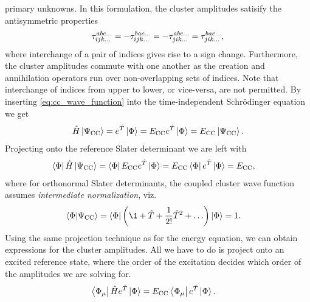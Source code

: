         primary unknowns.
        In this formulation, the cluster amplitudes satisify the antisymmetric
        properties
        \begin{align}
            \tau^{abc\dots}_{ijk\dots}
            = -\tau^{bac\dots}_{ijk\dots}
            = -\tau^{abc\dots}_{jik\dots}
            = \tau^{bac\dots}_{jik\dots},
        \end{align}
        where interchange of a pair of indices gives rise to a sign change.
        Furthermore, the cluster amplitudes commute with one another as the
        creation and annihilation operators run over non-overlapping sets of
        indices.
        Note that interchange of indices from upper to lower, or vice-versa, are
        not permitted.
        By inserting \autoref{eq:cc_wave_function} into the time-independent
        Schrödinger equation we get
        \begin{align}
            \hat{H}\ket{\Psi_{\text{CC}}}
            = e^{\hat{T}}\ket{\Phi}
            = E_{\text{CC}} e^{\hat{T}}\ket{\Phi}
            = E_{\text{CC}} \ket{\Psi_{\text{CC}}}.
        \end{align}
        Projecting onto the reference Slater determinant we are left with
        \begin{align}
            \bra{\Phi}\hat{H}\ket{\Psi_{\text{CC}}}
            &= \bra{\Phi}E_{\text{CC}} e^{\hat{T}}\ket{\Phi}
            = E_{\text{CC}} \bra{\Phi} e^{\hat{T}}\ket{\Phi}
            = E_{\text{CC}},
            \label{eq:cc_energy}
        \end{align}
        where for orthonormal Slater determinants, the coupled cluster wave
        function assumes \emph{intermediate normalization}, viz.
        \begin{align}
            \braket{\slat}{\cc}
            &= \bra{\slat}\para{
                \1 + \clust + \frac{1}{2!}\clust^2 + \dots
            }\ket{\slat}
            = 1.
        \end{align}
        Using the same projection technique as for the energy equation, we can
        obtain expressions for the cluster amplitudes.
        All we have to do is project onto an excited reference state, where the
        order of the excitation decides which order of the amplitudes we are
        solving for.
        \begin{align}
            \bra{\Phi_{\mu}}\hat{H} e^{\hat{T}}\ket{\Phi}
            &= E_{\text{CC}} \bra{\Phi_{\mu}} e^{\hat{T}}\ket{\Phi}.
            \label{eq:cc_amp}
        \end{align}
